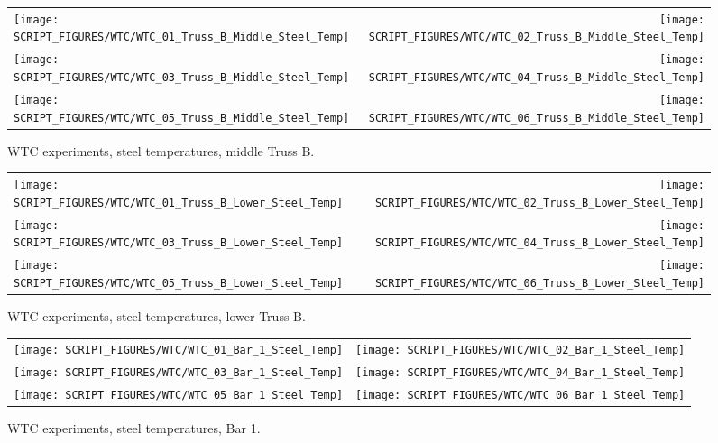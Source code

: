 \begin{figure}[p]
\begin{tabular*}{\textwidth}{l@{\extracolsep{\fill}}r}
\texttt{[image: SCRIPT\_FIGURES/WTC/WTC\_01\_Truss\_B\_Middle\_Steel\_Temp]} &
\texttt{[image: SCRIPT\_FIGURES/WTC/WTC\_02\_Truss\_B\_Middle\_Steel\_Temp]} \\
\texttt{[image: SCRIPT\_FIGURES/WTC/WTC\_03\_Truss\_B\_Middle\_Steel\_Temp]} &
\texttt{[image: SCRIPT\_FIGURES/WTC/WTC\_04\_Truss\_B\_Middle\_Steel\_Temp]} \\
\texttt{[image: SCRIPT\_FIGURES/WTC/WTC\_05\_Truss\_B\_Middle\_Steel\_Temp]} &
\texttt{[image: SCRIPT\_FIGURES/WTC/WTC\_06\_Truss\_B\_Middle\_Steel\_Temp]}
\end{tabular*}
\caption[WTC experiments, steel temperatures, middle Truss B]{WTC experiments, steel temperatures, middle Truss B.}
\label{NIST_WTC_Truss_B_Middle_Steel_Temp}
\end{figure}

\begin{figure}[p]
\begin{tabular*}{\textwidth}{l@{\extracolsep{\fill}}r}
\texttt{[image: SCRIPT\_FIGURES/WTC/WTC\_01\_Truss\_B\_Lower\_Steel\_Temp]} &
\texttt{[image: SCRIPT\_FIGURES/WTC/WTC\_02\_Truss\_B\_Lower\_Steel\_Temp]} \\
\texttt{[image: SCRIPT\_FIGURES/WTC/WTC\_03\_Truss\_B\_Lower\_Steel\_Temp]} &
\texttt{[image: SCRIPT\_FIGURES/WTC/WTC\_04\_Truss\_B\_Lower\_Steel\_Temp]} \\
\texttt{[image: SCRIPT\_FIGURES/WTC/WTC\_05\_Truss\_B\_Lower\_Steel\_Temp]} &
\texttt{[image: SCRIPT\_FIGURES/WTC/WTC\_06\_Truss\_B\_Lower\_Steel\_Temp]}
\end{tabular*}
\caption[WTC experiments, steel temperatures, lower Truss B]{WTC experiments, steel temperatures, lower Truss B.}
\label{NIST_WTC_Truss_B_Lower_Steel_Temp}
\end{figure}


\begin{figure}[p]
\begin{tabular*}{\textwidth}{l@{\extracolsep{\fill}}r}
\texttt{[image: SCRIPT\_FIGURES/WTC/WTC\_01\_Bar\_1\_Steel\_Temp]} &
\texttt{[image: SCRIPT\_FIGURES/WTC/WTC\_02\_Bar\_1\_Steel\_Temp]} \\
\texttt{[image: SCRIPT\_FIGURES/WTC/WTC\_03\_Bar\_1\_Steel\_Temp]} &
\texttt{[image: SCRIPT\_FIGURES/WTC/WTC\_04\_Bar\_1\_Steel\_Temp]} \\
\texttt{[image: SCRIPT\_FIGURES/WTC/WTC\_05\_Bar\_1\_Steel\_Temp]} &
\texttt{[image: SCRIPT\_FIGURES/WTC/WTC\_06\_Bar\_1\_Steel\_Temp]}
\end{tabular*}
\caption[WTC experiments, steel temperatures, Bar 1]{WTC experiments, steel temperatures, Bar 1.}
\label{NIST_WTC_Bar_1_Steel_Temp}
\end{figure}


